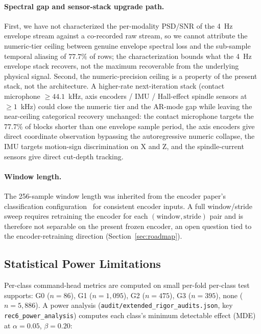 \documentclass[sensors,article,submit,moreauthors,pdftex]{Definitions/mdpi}
\begin{document}
\paragraph{Spectral gap and sensor-stack upgrade path.} First, we have not characterized the per-modality PSD/SNR of the 4~Hz envelope stream against a co-recorded raw stream, so we cannot attribute the numeric-tier ceiling between genuine envelope spectral loss and the sub-sample temporal aliasing of $77.7\%$ of rows; the characterization bounds what the 4~Hz envelope stack recovers, not the maximum recoverable from the underlying physical signal. Second, the numeric-precision ceiling is a property of the present stack, not the architecture. A higher-rate next-iteration stack (contact microphone $\geq 44.1$~kHz, axis encoders / IMU / Hall-effect spindle sensors at $\geq 1$~kHz) could close the numeric tier and the AR-mode gap while leaving the near-ceiling categorical recovery unchanged: the contact microphone targets the $77.7\%$ of blocks shorter than one envelope sample period, the axis encoders give direct coordinate observation bypassing the autoregressive numeric collapse, the IMU targets motion-sign discrimination on X and Z, and the spindle-current sensors give direct cut-depth tracking.

\paragraph{Window length.} The 256-sample window length was inherited from the encoder paper's classification configuration~\cite{encoder_paper} for consistent encoder inputs. A full window/stride sweep requires retraining the encoder for each $(\text{window}, \text{stride})$ pair and is therefore not separable on the present frozen encoder, an open question tied to the encoder-retraining direction (Section~\ref{sec:roadmap}).

\subsection{Statistical Power Limitations}
\label{sec:lim-power}

Per-class command-head metrics are computed on small per-fold per-class test supports: G0 ($n\!=\!86$), G1 ($n\!=\!1{,}095$), G2 ($n\!=\!475$), G3 ($n\!=\!395$), none ($n\!=\!5{,}886$). A power analysis (\texttt{audit/extended\_rigor\_audits.json}, key \texttt{rec6\_power\_analysis}) computes each class's minimum detectable effect (MDE) at $\alpha\!=\!0.05$, $\beta\!=\!0.20$:
\end{document}

